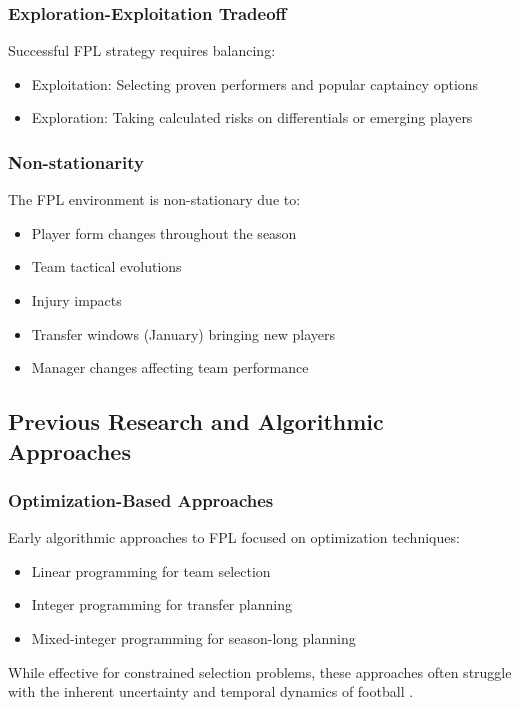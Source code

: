 \subsubsection{Exploration-Exploitation Tradeoff}

Successful FPL strategy requires balancing:
\begin{itemize}
    \item Exploitation: Selecting proven performers and popular captaincy options
    \item Exploration: Taking calculated risks on differentials or emerging players \cite{matthews2019}
\end{itemize}

\subsubsection{Non-stationarity}

The FPL environment is non-stationary due to:
\begin{itemize}
    \item Player form changes throughout the season
    \item Team tactical evolutions
    \item Injury impacts
    \item Transfer windows (January) bringing new players
    \item Manager changes affecting team performance \cite{dixon1997}
\end{itemize}

\subsection{Previous Research and Algorithmic Approaches}

\subsubsection{Optimization-Based Approaches}

Early algorithmic approaches to FPL focused on optimization techniques:
\begin{itemize}
    \item Linear programming for team selection
    \item Integer programming for transfer planning
    \item Mixed-integer programming for season-long planning
\end{itemize}

While effective for constrained selection problems, these approaches often struggle with the inherent uncertainty and temporal dynamics of football \cite{pantuso2017, rotshtein2005}.

